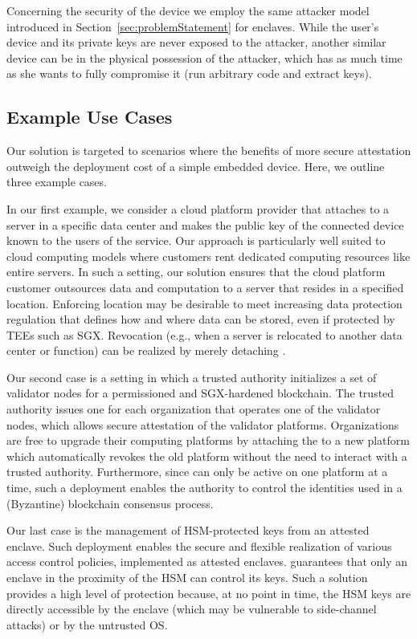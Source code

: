 Concerning the security of the \device device we employ the same attacker model introduced in Section~\ref{sec:problemStatement} for enclaves. While the user's device and its private keys are never exposed to the attacker, another similar device can be in the physical possession of the attacker, which has as much time as she wants to fully compromise it (run arbitrary code and extract keys). 


\subsection{Example Use Cases}
\label{sec:use-cases}

Our solution is targeted to scenarios where the benefits of more secure attestation outweigh the deployment cost of a simple embedded device. Here, we outline three example cases.  

 In our first example, we consider a cloud platform provider that attaches \device to a server in a specific data center and makes the public key of the connected device known to the users of the service. Our approach is particularly well suited to cloud computing models where customers rent dedicated computing resources like entire servers. In such a setting, our solution ensures that the cloud platform customer outsources data and computation to a server that resides in a specified location. Enforcing location may be desirable to meet increasing data protection regulation that defines how and where data can be stored, even if protected by TEEs such as SGX. Revocation (e.g., when a server is relocated to another data center or function) can be realized by merely detaching \device.

 Our second case is a setting in which a trusted authority initializes a set of validator nodes for a permissioned and SGX-hardened blockchain. 
The trusted authority issues one \device for each organization that operates one of the validator nodes, which allows secure attestation of the validator platforms. Organizations are free to upgrade their computing platforms by attaching the \device to a new platform which automatically revokes the old platform without the need to interact with a trusted authority. Furthermore, since \device can only be active on one platform at a time, such a deployment enables the authority to control the identities used in a (Byzantine) blockchain consensus process.



 Our last case is the management of HSM-protected keys from an attested enclave. Such deployment enables the secure and flexible realization of various access control policies, implemented as attested enclaves. \name guarantees that only an enclave in the proximity of the HSM can control its keys. Such a solution provides a high level of protection because, at no point in time, the HSM keys are directly accessible by the enclave (which may be vulnerable to side-channel attacks) or by the untrusted OS.


